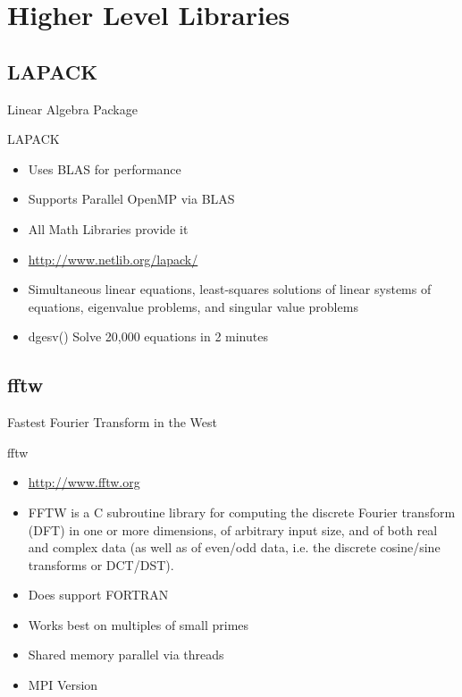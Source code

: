 \documentclass[handout]{beamer}
\begin{document}
\section{Higher Level Libraries}
\subsection{LAPACK}
\begin{frame}{Linear Algebra Package}
 \begin{block}{LAPACK}
  \begin{itemize}
   \item Uses BLAS for performance
   \item Supports Parallel OpenMP via BLAS
   \item All Math Libraries provide it
   \item \url{http://www.netlib.org/lapack/}
   \item Simultaneous linear equations, least-squares solutions of linear systems of equations, eigenvalue problems, and singular value problems
   \item dgesv() Solve 20,000 equations in 2 minutes
  \end{itemize}
 \end{block}
\end{frame}

\subsection{fftw}
\begin{frame}{Fastest Fourier Transform in the West}
 \begin{block}{fftw}
  \begin{itemize}
   \item \url{http://www.fftw.org}
   \item FFTW is a C subroutine library for computing the discrete Fourier transform (DFT) in one or more dimensions, of arbitrary input size, and of both real and complex data (as well as of even/odd data, i.e. the discrete cosine/sine transforms or DCT/DST). 
   \item Does support FORTRAN
   \item Works best on multiples of small primes
   \item Shared memory parallel via threads
   \item MPI Version
  \end{itemize}
 \end{block}
\end{frame}
\end{document}
